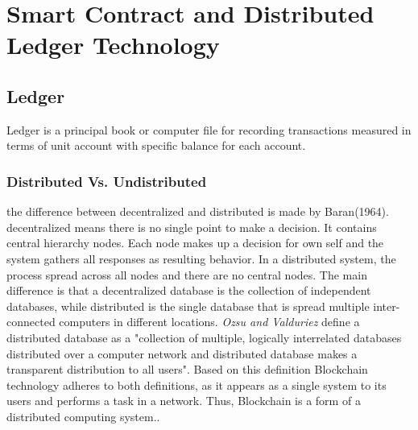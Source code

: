 \chapter{Smart Contract and Distributed Ledger Technology}

\section{Ledger}
Ledger is a principal book or computer file for recording transactions measured in terms of unit account with specific balance for each account\cite{Markos}.

\subsection{Distributed Vs. Undistributed }
the difference between decentralized and distributed is made by Baran(1964). decentralized means there is no single point to make a decision. It contains central hierarchy nodes. Each node makes up a decision for own self and the system gathers all responses as resulting behavior. In a distributed system, the process spread across all nodes and there are no central nodes. The main difference is that a decentralized database is the collection of independent databases, while distributed is the single database that is spread multiple inter-connected computers in different locations. \textit{Ozsu and Valduriez} define a distributed database as a "collection of multiple, logically interrelated databases distributed over a computer network and distributed database makes a transparent distribution to all users"\cite{Ozsu}. Based on this definition Blockchain technology adheres to both definitions, as it appears as a single system to its users and performs a task in a network. Thus, Blockchain is a form of a distributed computing system.\cite{Markos}.


